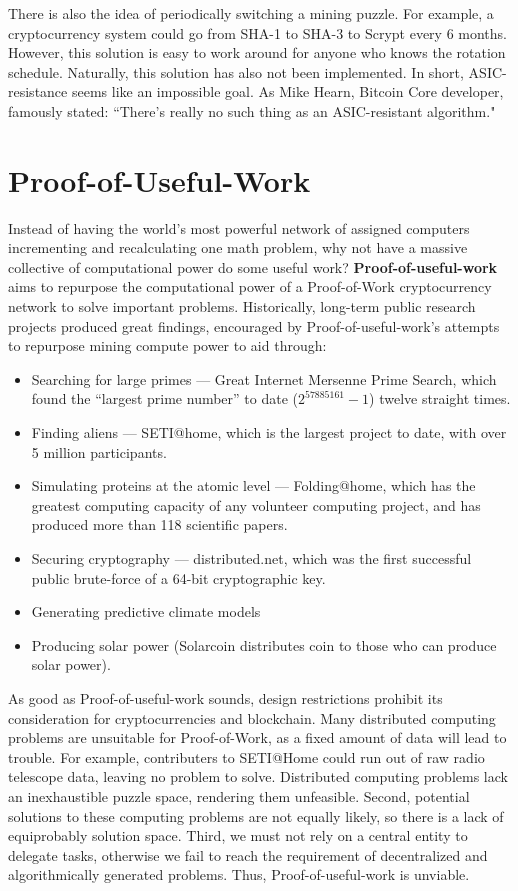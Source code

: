 \documentclass[full.tex]{subfiles}
\begin{document}
    There is also the idea of periodically switching a mining puzzle. For example, a cryptocurrency system could go from SHA-1 to SHA-3 to Scrypt every 6 months. However, this solution is easy to work around for anyone who knows the rotation schedule. Naturally, this solution has also not been implemented. In short, ASIC-resistance seems like an impossible goal. As Mike Hearn, Bitcoin Core developer, famously stated: ``There's really no such thing as an ASIC-resistant algorithm."
    
    \section*{Proof-of-Useful-Work}
    
    Instead of having the world's most powerful network of assigned computers incrementing and recalculating one math problem, why not have a massive collective of computational power do some useful work? \textbf{Proof-of-useful-work} aims to repurpose the computational power of a Proof-of-Work cryptocurrency network to solve important problems. Historically, long-term public research projects produced great findings, encouraged by Proof-of-useful-work's attempts to repurpose mining compute power to aid through:
    
    \begin{itemize}
        \item Searching for large primes --- Great Internet Mersenne Prime Search, which found the ``largest prime number'' to date ($2^{57885161} - 1$) twelve straight times.
        \item Finding aliens --- SETI@home, which is the largest project to date, with over 5 million participants.
        \item Simulating proteins at the atomic level --- Folding@home, which has the greatest computing capacity of any volunteer computing project, and has produced more than 118 scientific papers. 
        \item Securing cryptography --- distributed.net, which was the first successful public brute-force of a 64-bit cryptographic key.
        \item Generating predictive climate models 
        \item Producing solar power (Solarcoin distributes coin to those who can produce solar power).
    \end{itemize}
    
    As good as Proof-of-useful-work sounds, design restrictions prohibit its consideration for cryptocurrencies and blockchain. Many distributed computing problems are unsuitable for Proof-of-Work, as a fixed amount of data will lead to trouble. For example, contributers to SETI@Home could run out of raw radio telescope data, leaving no problem to solve. Distributed computing problems lack an inexhaustible puzzle space, rendering them unfeasible. Second, potential solutions to these computing problems are not equally likely, so there is a lack of equiprobably solution space. Third, we must not rely on a central entity to delegate tasks, otherwise we fail to reach the requirement of decentralized and algorithmically generated problems. Thus, Proof-of-useful-work is unviable.
    
\end{document}
